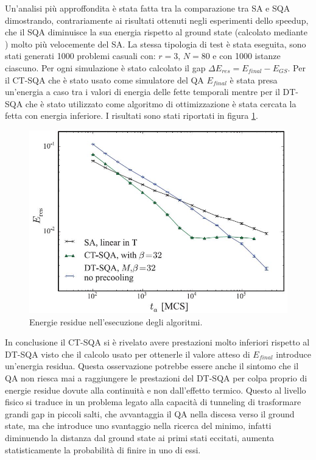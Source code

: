 \cite{QVC}Un'analisi più approffondita è stata fatta tra la comparazione tra SA e SQA dimostrando, contrariamente ai risultati ottenuti negli esperimenti dello speedup, che il SQA diminuisce la sua energia rispetto al ground state (calcolato mediante \cite{SRVR}) molto più velocemente del SA. La stessa tipologia di test è stata eseguita, sono stati generati 1000 problemi casuali con:  $r=3$, $N=80$ e con 1000 istanze ciascuno. Per ogni simulazione è stato calcolato il gap $\Delta E_{res} = E_{final} - E_{GS}$. Per il CT-SQA che è stato usato come simulatore del QA $E_{final}$ è stata presa un'energia a caso tra i valori di energia delle fette temporali mentre per il DT-SQA che è stato utilizzato come algoritmo di ottimizzazione è stata cercata la fetta con energia inferiore.
I risultati sono stati riportati in figura \ref{figura:residua}.
\begin{figure}[htbp]
  \centering
  \includegraphics[scale=0.6]{Immagini/residua.jpg}
  \caption{Energie residue nell'esecuzione degli algoritmi.}
  \label{figura:residua}
\end{figure}

\newpage
{}
In conclusione il CT-SQA si è rivelato avere prestazioni molto inferiori rispetto al DT-SQA visto che il calcolo usato per ottenerle il valore atteso di $E_{final}$ introduce un'energia residua. Questa osservazione potrebbe essere anche il sintomo che il QA non riesca mai a raggiungere le prestazioni del DT-SQA per colpa proprio di energie residue dovute alla continuità e non dall'effetto termico.
Questo al livello fisico si traduce in un problema legato alla capacità di tunneling di trasformare grandi gap in piccoli salti, che avvantaggia il QA nella discesa verso il ground state, ma che introduce uno svantaggio nella ricerca del minimo, infatti diminuendo la distanza dal ground state ai primi stati eccitati, aumenta statisticamente la probabilità di finire in uno di essi.

